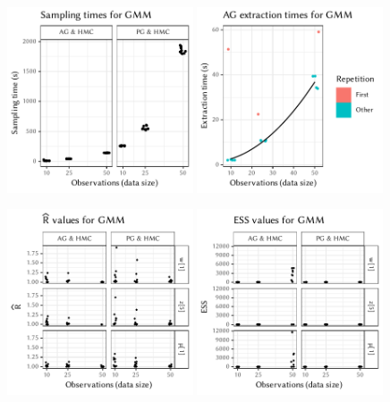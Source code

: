 \begin{figure}[p]
  \centering
  \includegraphics[width=0.49\textwidth]{figures/GMM-sampling_times}
  \includegraphics[width=0.49\textwidth]{figures/GMM-compile_times}
  \par
  \includegraphics[width=0.49\textwidth]{figures/GMM-rhat}
  \includegraphics[width=0.49\textwidth]{figures/GMM-ess}

\end{figure}
